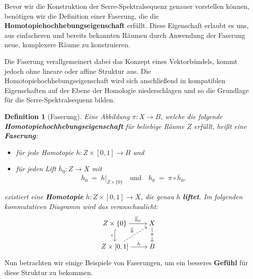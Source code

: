 \documentclass[12pt]{article}
\numberwithin{conj}{section}
\newtheorem{definition}[conj]{Definition}
\begin{document}
Bevor wir die Konstruktion der Serre-Spektralsequenz genauer vorstellen können, benötigen wir die Definition einer Faserung, die die \textbf{Homotopiehochhebungseigenschaft} erfüllt. Diese Eigenschaft erlaubt es uns, aus einfacheren und bereits bekannten Räumen durch Anwendung der Faserung neue, komplexere Räume zu konstruieren. 

Die Faserung verallgemeinert dabei das Konzept eines Vektorbündels, kommt jedoch ohne lineare oder affine Struktur aus. Die Homotopiehochhebungseigenschaft wird sich anschließend in kompatiblen Eigenschaften auf der Ebene der Homologie niederschlagen und so die Grundlage für die Serre-Spektralsequenz bilden.

\begin{definition}[Faserung]
    Eine Abbildung \(\pi : X \to B\), welche die folgende \textbf{Homotopiehochhebungseigenschaft} für beliebige Räume \(Z\) erfüllt, heißt eine \textbf{Faserung}:
    \begin{itemize}[noitemsep]
        \item für jede Homotopie \(h : Z \times [0,1] \to B\) und
        \item für jeden Lift \(\overline{h}_0 : Z \to X\) mit 
              \[
                h_0 \;=\; h\vert_{Z\times \{0\}}
                \quad\text{und}\quad 
                h_0 \;=\; \pi \circ \overline{h}_0,
              \]
    \end{itemize}
    existiert eine \textbf{Homotopie} \(\overline{h} : Z \times [0,1] \to X\), die genau \(h\) \textbf{liftet}. Im folgenden kommutativen Diagramm wird das veranschaulicht:
    \[\begin{tikzcd}[cramped]
        {Z\times\{0\}} & X \\
        {Z\times[0,1]} & B
        \arrow["{\overline{h}_0}", from=1-1, to=1-2]
        \arrow["\iota"', hook, from=1-1, to=2-1]
        \arrow["\pi"{description}, from=1-2, to=2-2]
        \arrow["{\overline{h}}", dashed, from=2-1, to=1-2]
        \arrow["h", from=2-1, to=2-2]
        \end{tikzcd}\]
        \end{definition}
        
        \noindent
        Nun betrachten wir einige Beispiele von Faserungen, um ein besseres \textbf{Gefühl} für diese Struktur zu bekommen.
        
\end{document}
